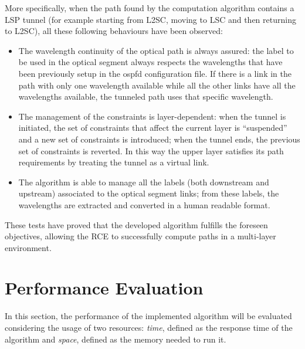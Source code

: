 \documentclass[10pt,a4paper]{report}
\begin{document}
More specifically, when the path found by the computation algorithm
contains a LSP tunnel (for example starting from L2SC, moving to LSC
and then returning to L2SC), all these following behaviours have been
observed:
\begin{itemize}
\item The wavelength continuity of the optical path is always assured:
  the label to be used in the optical segment always respects the
  wavelengths that have been previously setup in the ospfd
  configuration file. If there is a link in the path with only one
  wavelength available while all the other links have all the
  wavelengths available, the tunneled path uses that specific
  wavelength.
\item The management of the constraints is layer-dependent: when the
  tunnel is initiated, the set of constraints that affect the current
  layer is ``suspended'' and a new set of constraints is introduced;
  when the tunnel ends, the previous set of constraints is
  reverted. In this way the upper layer satisfies its path
  requirements by treating the tunnel as a virtual link.
\item The algorithm is able to manage all the labels (both downstream
  and upstream) associated to the optical segment links; from these
  labels, the wavelengths are extracted and converted in a human
  readable format.
\end{itemize}

These tests have proved that the developed algorithm fulfills the
foreseen objectives, allowing the RCE to successfully compute paths in
a multi-layer environment.

\section{Performance Evaluation}

In this section, the performance of the implemented algorithm will be
evaluated considering the usage of two resources: \textit{time},
defined as the response time of the algorithm and \textit{space},
defined as the memory needed to run it.
\end{document}
